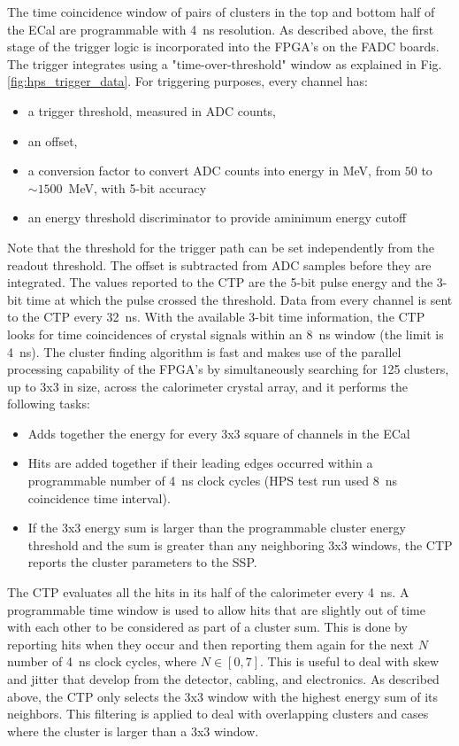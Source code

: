 \documentclass[final,3p,times,twocolumn]{elsarticle}
\begin{document}
The time coincidence window of pairs of clusters in the top and bottom half of the ECal are 
programmable with 4~ns resolution.  As described above, the first stage of the trigger logic is 
incorporated into the FPGA's on the FADC boards. The trigger  
integrates using a "time-over-threshold" window as explained in Fig. \ref{fig:hps_trigger_data}.
For triggering purposes, every channel has: 
\begin{itemize}
 \item a trigger threshold, measured in ADC counts, 
 \item an offset, 
 \item a conversion factor to convert ADC counts into energy in MeV, from $50$ to $\sim1500$~MeV, with 5-bit accuracy 
 \item an energy threshold discriminator to provide aminimum energy cutoff
 \end{itemize}
Note that the threshold for the trigger path can be set independently from the readout threshold.
The offset is subtracted from ADC samples before they are integrated.  
The values reported to the CTP are the 5-bit pulse energy and the 3-bit time at which the 
pulse crossed the threshold. Data from every channel is sent to the CTP every 32~ns. With the available 
3-bit time information, the CTP looks for time coincidences of crystal signals within an 8~ns window (the 
limit is 4~ns).
The cluster finding algorithm is fast and makes use of the parallel processing capability of the FPGA's by 
simultaneously searching for 125 clusters, up to 3x3 in size, across the calorimeter crystal array, and it 
performs the following tasks:
\begin{itemize}
\item Adds together the energy for every 3x3 square of channels in the ECal
\item Hits are added together if their leading edges occurred within a programmable number of 4~ns 
clock cycles  (HPS test run used 8~ns coincidence time interval).
\item If the 3x3 energy sum is larger than the programmable cluster energy threshold and the sum is 
greater than any neighboring 3x3 windows, the CTP reports the cluster parameters to the SSP. 
\end{itemize}
The CTP evaluates all the hits in its half of the calorimeter every 4~ns. A programmable time window is 
used to allow hits that are slightly out of time with each other to be considered as part of a cluster sum. 
This is done by reporting hits when they occur and then reporting them again for the next $N$ number of 
4~ns clock cycles, where $N \in [0,7]$. This is useful to deal with skew and jitter that develop from the 
detector, cabling, and electronics. As described above, the CTP only selects the 3x3 window with the 
highest energy sum of its neighbors. This filtering is applied to deal with overlapping clusters and cases 
where the cluster is larger than a 3x3 window.
\end{document}
